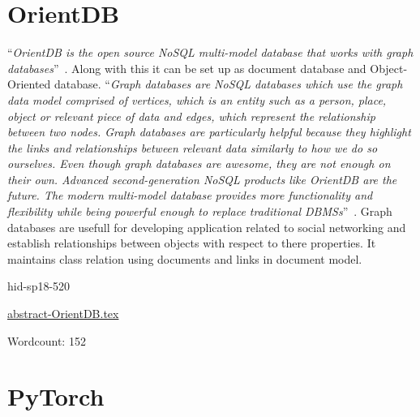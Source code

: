 \section{OrientDB}

\color{blue}``\emph{OrientDB is the open source NoSQL multi-model database that works with graph 
databases}''\color{black}~\cite{hid-sp18-520-OrientDB}. Along with this it can be set up as 
document database and Object-Oriented database. 
\color{blue}``\emph{Graph databases are NoSQL databases which use the graph data model comprised 
of vertices, which is an entity such as a person, place, object or relevant 
piece of data and edges, which represent the relationship between two nodes.
Graph databases are particularly helpful because they highlight the links and
relationships between relevant data similarly to how we do so ourselves.
Even though graph databases are awesome, they are not enough on their own.
Advanced second-generation NoSQL products like OrientDB are the future. The 
modern multi-model database provides more functionality and flexibility while
being powerful enough to replace traditional 
DBMSs}''\color{black}~\cite{hid-sp18-520-OrientDB-graph}.
Graph databases are usefull for developing application related to social 
networking and establish relationships between objects with respect to there 
properties. It maintains class relation using documents and links in document 
model.


\begin{IU}

hid-sp18-520

\href{https://github.com/cloudmesh-community/hid-sp18-520/blob/master//technology/abstract-OrientDB.tex}{abstract-OrientDB.tex}

 

Wordcount: 152

\end{IU}

\section{PyTorch}


